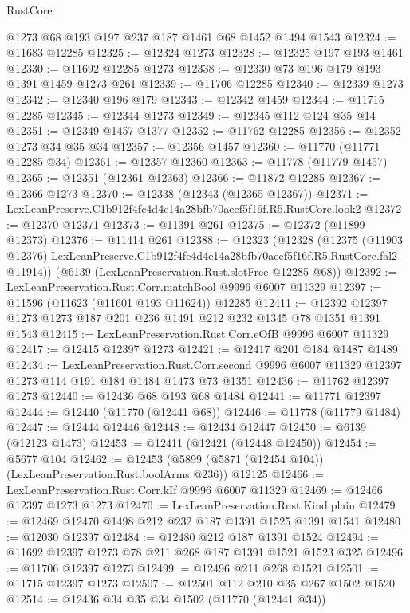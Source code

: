 \begin{lexlean}{RustCore}
\begin{coremodule}
    @1273
    @68
    @193
    @197
    @237
    @187
    @1461
    @68
    @1452
    @1494
    @1543
@12324 := @11683 @12285
@12325 := @12324 @1273
@12328 := @12325 @197 @193 @1461
@12330 := @11692 @12285 @1273
@12338 := @12330 @73 @196 @179 @193 @1391 @1459 @1273 @261
@12339 := @11706 @12285
@12340 := @12339 @1273
@12342 := @12340 @196 @179
@12343 := @12342 @1459
@12344 := @11715 @12285
@12345 := @12344 @1273
@12349 := @12345 @112 @124 @35 @14
@12351 := @12349 @1457 @1377
@12352 := @11762 @12285
@12356 := @12352 @1273 @34 @35 @34
@12357 := @12356 @1457
@12360 := @11770 (@11771 @12285 @34)
@12361 := @12357 @12360
@12363 := @11778 (@11779 @1457)
@12365 := @12351 (@12361 @12363)
@12366 := @11872 @12285
@12367 := @12366 @1273
@12370 := @12338 (@12343 (@12365 @12367))
@12371 := LexLeanPreserve.C1b912f4fc4d4e14a28bfb70aeef5f16f.R5.RustCore.look2
@12372 := @12370 @12371
@12373 := @11391 @261
@12375 := @12372 (@11899 @12373)
@12376 := @11414 @261
@12388 := @12323
    (@12328
      (@12375
        (@11903 @12376)
        LexLeanPreserve.C1b912f4fc4d4e14a28bfb70aeef5f16f.R5.RustCore.fal2
        @11914))
    (@6139 (LexLeanPreservation.Rust.slotFree @12285 @68))
@12392 := LexLeanPreservation.Rust.Corr.matchBool @9996 @6007 @11329
@12397 := @11596 (@11623 (@11601 @193 @11624)) @12285
@12411 := @12392 @12397 @1273 @1273 @187 @201 @236 @1491 @212 @232 @1345 @78 @1351 @1391 @1543
@12415 := LexLeanPreservation.Rust.Corr.eOfB @9996 @6007 @11329
@12417 := @12415 @12397 @1273
@12421 := @12417 @201 @184 @1487 @1489
@12434 := LexLeanPreservation.Rust.Corr.second
    @9996
    @6007
    @11329
    @12397
    @1273
    @114
    @191
    @184
    @1484
    @1473
    @73
    @1351
@12436 := @11762 @12397 @1273
@12440 := @12436 @68 @193 @68 @1484
@12441 := @11771 @12397
@12444 := @12440 (@11770 (@12441 @68))
@12446 := @11778 (@11779 @1484)
@12447 := @12444 @12446
@12448 := @12434 @12447
@12450 := @6139 (@12123 @1473)
@12453 := @12411 (@12421 (@12448 @12450))
@12454 := @5677 @104
@12462 := @12453 (@5899 (@5871 (@12454 @104)) (LexLeanPreservation.Rust.boolArms @236)) @12125
@12466 := LexLeanPreservation.Rust.Corr.kIf @9996 @6007 @11329
@12469 := @12466 @12397 @1273 @1273
@12470 := LexLeanPreservation.Rust.Kind.plain
@12479 := @12469 @12470 @1498 @212 @232 @187 @1391 @1525 @1391 @1541
@12480 := @12030 @12397
@12484 := @12480 @212 @187 @1391 @1524
@12494 := @11692 @12397 @1273 @78 @211 @268 @187 @1391 @1521 @1523 @325
@12496 := @11706 @12397 @1273
@12499 := @12496 @211 @268 @1521
@12501 := @11715 @12397 @1273
@12507 := @12501 @112 @210 @35 @267 @1502 @1520
@12514 := @12436 @34 @35 @34 @1502 (@11770 (@12441 @34))

\end{coremodule}
\end{lexlean}
